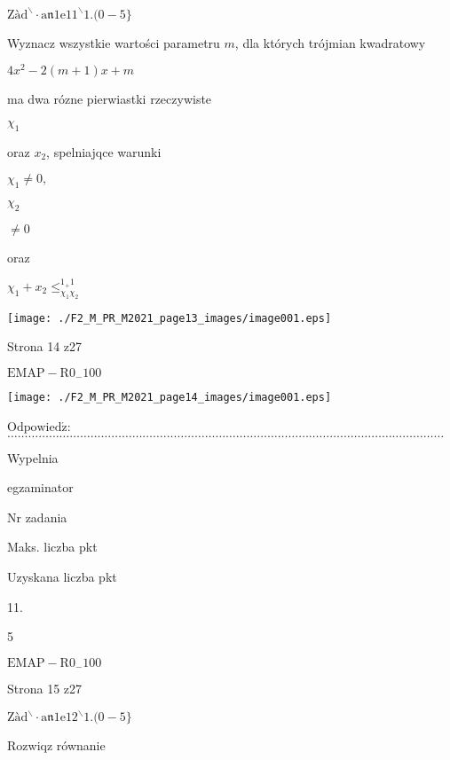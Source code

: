 \documentclass[a4paper,12pt]{article}
\begin{document}
$\mathrm{Z}\text{à} \mathrm{d}^{\backslash }\cdot \mathrm{a}\mathfrak{n}1\mathrm{e}11^{\backslash }1.(0-5\}$

Wyznacz wszystkie wartości parametru $m$, dla których trójmian kwadratowy

$4x^{2}-2(m+1)x+m$

ma dwa rózne pierwiastki rzeczywiste

$\chi_{1}$

oraz $x_{2}$, spelniajqce warunki

$\chi_{1} \neq 0,$

$\chi_{2}$

$\neq 0$

oraz

$\chi_{1} +x_{2} \leq_{\chi_{1}\chi_{2}}^{1_{+}1}$
\begin{center}
\texttt{[image: ./F2\_M\_PR\_M2021\_page13\_images/image001.eps]}
\end{center}
Strona 14 z27

$\mathrm{E}\mathrm{M}\mathrm{A}\mathrm{P}-\mathrm{R}0_{-}100$




\begin{center}
\texttt{[image: ./F2\_M\_PR\_M2021\_page14\_images/image001.eps]}
\end{center}
$\mathrm{O}\mathrm{d}\mathrm{p}\mathrm{o}\mathrm{w}\mathrm{i}\mathrm{e}\mathrm{d}\acute{\mathrm{z}}$:$\ldots\ldots\ldots\ldots\ldots\ldots\ldots\ldots\ldots\ldots\ldots\ldots\ldots\ldots\ldots\ldots\ldots\ldots\ldots\ldots\ldots\ldots\ldots\ldots\ldots\ldots\ldots\ldots\ldots\ldots\ldots\ldots\ldots\ldots\ldots\ldots\ldots\ldots\ldots\ldots\ldots\ldots$

Wypelnia

egzaminator

Nr zadania

Maks. liczba pkt

Uzyskana liczba pkt

11.

5

$\mathrm{E}\mathrm{M}\mathrm{A}\mathrm{P}-\mathrm{R}0_{-}100$

Strona 15 z27





$\mathrm{Z}\text{à} \mathrm{d}^{\backslash }\cdot \mathrm{a}\mathfrak{n}1\mathrm{e}12^{\backslash }1.(0-5\}$

Rozwiqz równanie
\end{document}
